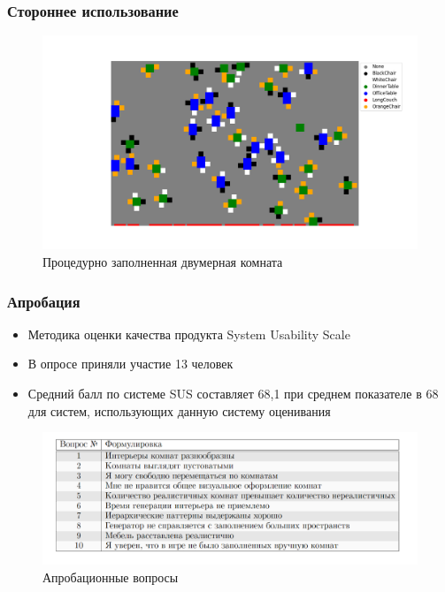 \documentclass{beamer}
\begin{document}
\begin{frame}
  \frametitle{Стороннее использование}
    \begin{figure}
      \centering
        \includegraphics[width=\textwidth]{pictures/myplot.png}
        \caption{Процедурно заполненная двумерная комната}
  \end{figure}
\end{frame}

\begin{frame}[t]
  \frametitle{Апробация}
    \begin{itemize}
        \item Методика оценки качества продукта System Usability Scale
        \item В опросе приняли участие 13 человек  
        \item Средний балл по системе SUS составляет 68,1 при среднем показателе в 68 для систем, использующих данную систему оценивания
      \end{itemize} 
      \begin{figure}
      \centering
        \includegraphics[width=\textwidth]{pictures/questions.png}
        \caption{Апробационные вопросы}
    \end{figure}
   
\end{frame}
\end{document}
